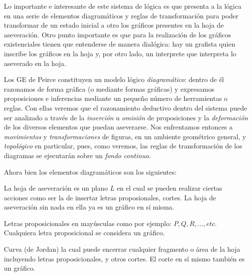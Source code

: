 \documentclass[
	fontsize=10pt, %
	twoside=true, %
	secnumdepth=1, %
	abstract=true, %
]{kaohandt}
\begin{document}
Lo importante e interesante de este sistema de lógica es que presenta a la lógica en una serie de elementos diagramáticos y reglas de transformación para poder transformar de un estado inicial a otro los gráficos presentes en la hoja de aseveración. Otro punto importante es que para la realización de los gráficos existenciales tienen que entenderse de manera dialógica: hay un grafista quien inscribe los gráficos en la hoja y, por otro lado, un interprete que interpreta lo aseverado en la hoja. 

Los GE de Peirce constituyen un modelo lógico \emph{diagramático}: dentro de él razonamos de forma gráfica (o mediante formas gráficas) y expresamos proposiciones e inferencias mediante un pequeño número de herramientas o reglas. Con ellas veremos que el razonamiento deductivo dentro del sistema puede ser analizado a través de la \emph{ inserción} u \emph{ omisión} de proposiciones y la \emph{ deformación} de los diversos elementos que puedan aseverarse. Nos enfrentamos entonces a \emph{ movimientos} y \emph{ transformaciones} de figuras, en un ambiente geométrico general, y \emph{ topológico} en particular, pues, como veremos, las reglas de transformación de los diagramas se ejecutarán sobre un \emph{ fondo continuo}.

Ahora bien los elementos diagramáticos son los siguientes:

\begin{definition}
	La hoja de aseveración es un plano $ L $ en el cual se pueden realizar ciertas acciones como ser la de insertar letras proposionales, cortes. La hoja de aseveración sin nada en ella ya es un gráfico en sí misma.
\end{definition}

\begin{definition}
	Letras proposicionales en mayúsculas como por ejemplo: $ P, Q, R, \dots, etc $. Cualquiera letra proposicional se considera un gráfico.
\end{definition}

\begin{definition}[Corte]
	Curva (de Jordan) la cual puede encerrar cualquier fragmento o área de la hoja incluyendo letras proposicionales, y otros cortes. El corte en sí mismo también es un gráfico.
\end{definition}
\end{document}
